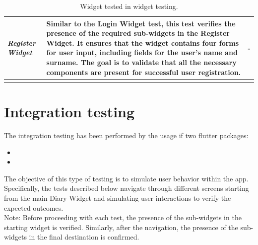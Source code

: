 \documentclass{Configuration_Files/PoliMi3i_thesis}
\begin{document}
\begin{longtable}{|m{3cm}|m{6cm}|m{5cm}|}
    \hline
    \textit{Register Widget} & Similar to the Login Widget test, this test verifies the presence of the required sub-widgets in the Register Widget. It ensures that the widget contains four forms for user input, including fields for the user's name and surname. The goal is to validate that all the necessary components are present for successful user registration. & -\\
    \hline
    \caption{Widget tested in widget testing.}
\end{longtable}

\section{Integration testing}
The integration testing has been performed by the usage if two flutter packages:
\begin{itemize}
    \item {}
    \item {}
\end{itemize}
The objective of this type of testing is to simulate user behavior within the app. Specifically, the tests described below navigate through different screens starting from the main Diary Widget and simulating user interactions to verify the expected outcomes.
\\
Note: Before proceeding with each test, the presence of the sub-widgets in the starting widget is verified. Similarly, after the navigation, the presence of the sub-widgets in the final destination is confirmed.
\end{document}
